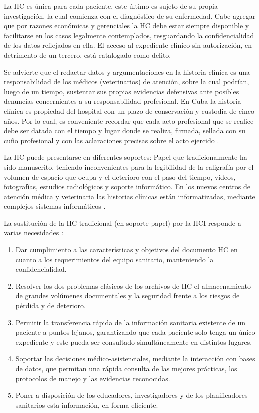 La HC es única para cada paciente, este último es sujeto de su propia investigación, la cual comienza con el diagnóstico de su enfermedad. Cabe agregar que por razones económicas y gerenciales la HC debe estar siempre disponible y facilitarse en los casos legalmente contemplados, resguardando la confidencialidad de los datos reflejados en ella. El acceso al expediente clínico sin autorización, en detrimento de un tercero, está catalogado como delito.

Se advierte que el redactar datos y argumentaciones en la historia clínica es una responsabilidad de los médicos (veterinarios) de atención, sobre la cual podrían, luego de un tiempo, sustentar sus propias evidencias defensivas ante posibles denuncias concernientes a su responsabilidad profesional. En Cuba la historia clínica es propiedad del hospital con un plazo de conservación y custodia de cinco años. Por lo cual, es conveniente recordar que cada acto profesional que se realice debe ser datada con el tiempo y lugar donde se realiza, firmada, sellada con su cuño profesional y con las aclaraciones precisas sobre el acto ejercido   .

La HC puede presentarse en diferentes soportes: Papel que tradicionalmente ha sido manuscrito, teniendo inconvenientes para la legibilidad de la caligrafía por el volumen de espacio que ocupa y el deterioro con el paso del tiempo, videos, fotografías, estudios radiológicos y soporte informático. En los nuevos centros de atención médica y veterinaria las historias clínicas están informatizadas, mediante complejos sistemas informáticos .

La sustitución de la HC tradicional (en soporte papel) por la HCI responde a varias necesidades :  

\begin{enumerate}
	\item Dar cumplimiento a las características y objetivos del documento HC en cuanto a los requerimientos del equipo sanitario, manteniendo la confidencialidad.  
	
	\item Resolver los dos problemas clásicos de los archivos de HC el almacenamiento de grandes volúmenes documentales y la seguridad frente a los riesgos de pérdida y de deterioro.  
	
	\item Permitir la transferencia rápida de la información sanitaria existente de un paciente a puntos lejanos, garantizando que cada paciente solo tenga un único expediente y este pueda ser consultado simultáneamente en distintos lugares.  
	
	\item Soportar las decisiones médico-asistenciales, mediante la interacción con bases de datos, que permitan una rápida consulta de las mejores prácticas, los protocolos de manejo y las evidencias reconocidas.  
	
	\item Poner a disposición de los educadores, investigadores y de los planificadores sanitarios esta información, en forma eficiente. 
\end{enumerate}

